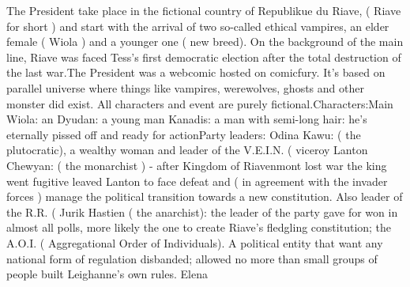 \documentclass[12pt]{book}
\begin{document}
The President take place in the fictional country of Republikue du Riave, ( Riave for short ) and start with the arrival of two so-called ethical vampires, an elder female ( Wiola ) and a younger one ( new breed). On the background of the main line, Riave was faced Tess's first democratic election after the total destruction of the last war.The President was a webcomic hosted on comicfury. It's based on parallel universe where things like vampires, werewolves, ghosts and other monster did exist. All characters and event are purely fictional.Characters:Main Wiola: an Dyudan: a young man Kanadis: a man with semi-long hair: he's eternally pissed off and ready for actionParty leaders: Odina Kawu: ( the plutocratic), a wealthy woman and leader of the V.E.I.N. (  viceroy Lanton Chewyan: ( the monarchist ) - after Kingdom of Riavenmont lost war the king went fugitive leaved Lanton to face defeat and ( in agreement with the invader forces ) manage the political transition towards a new constitution. Also leader of the R.R. (  Jurik Hastien ( the anarchist): the leader of the party gave for won in almost all polls, more likely the one to create Riave's fledgling constitution; the A.O.I. ( Aggregational Order of Individuals). A political entity that want any national form of regulation disbanded; allowed no more than small groups of people built Leighanne's own rules. Elena
\end{document}
